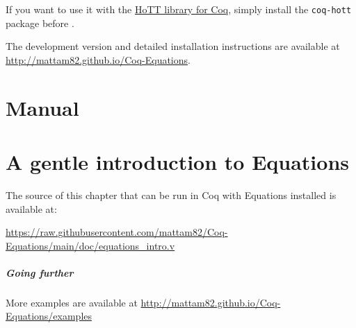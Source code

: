 \documentclass{report}
\begin{document}
If you want to use it with the \href{https://github.com/HoTT/HoTT}{HoTT library for Coq}, simply install the 
\texttt{coq-hott} package before \Equations.

The development version and detailed installation instructions are available at
\url{http://mattam82.github.io/Coq-Equations}.

\doparttoc
\parttoc
\tableofcontents

\chapter{Manual}
\label{cha:manual}


\chapter{A gentle introduction to Equations}
\label{cha:gentle-intro}

The source of this chapter that can be run in Coq with Equations
installed is available at:

\url{https://raw.githubusercontent.com/mattam82/Coq-Equations/main/doc/equations_intro.v}



\paragraph{Going further}

More examples are available at \url{http://mattam82.github.io/Coq-Equations/examples}


\label{cha:bibliography}

\end{document}
